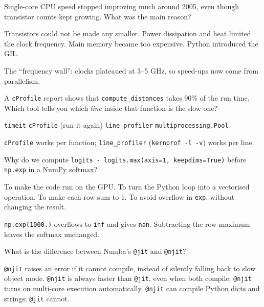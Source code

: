\documentclass[addpoints,11pt]{exam}
\newcommand{\q}{\Needspace{7\baselineskip}\question}
\begin{document}
\begin{questions}

\q[4]
Single-core CPU speed stopped improving much around 2005, even though transistor counts kept
growing. What was the main reason?
\begin{choices}
  \choice Transistors could not be made any smaller.
  \CorrectChoice Power dissipation and heat limited the clock frequency.
  \choice Main memory became too expensive.
  \choice Python introduced the GIL.
\end{choices}
\begin{solution}The ``frequency wall'': clocks plateaued at 3--5 GHz, so speed-ups now come from parallelism.\end{solution}

\q[4]
A \texttt{cProfile} report shows that \texttt{compute\_distances} takes 90\% of the run time. Which tool
tells you which \emph{line} inside that function is the slow one?
\begin{choices}
  \choice \texttt{timeit}
  \choice \texttt{cProfile} (run it again)
  \CorrectChoice \texttt{line\_profiler}
  \choice \texttt{multiprocessing.Pool}
\end{choices}
\begin{solution}\texttt{cProfile} works per function; \texttt{line\_profiler} (\texttt{kernprof -l -v}) works per line.\end{solution}

\q[4]
Why do we compute \texttt{logits - logits.max(axis=1, keepdims=True)} before \texttt{np.exp} in a
NumPy softmax?
\begin{choices}
  \choice To make the code run on the GPU.
  \choice To turn the Python loop into a vectorised operation.
  \choice To make each row sum to 1.
  \CorrectChoice To avoid overflow in \texttt{exp}, without changing the result.
  
\end{choices}
\begin{solution}\texttt{np.exp(1000.)} overflows to \texttt{inf} and gives \texttt{nan}. Subtracting the row maximum leaves the softmax unchanged.\end{solution}

\q[4]
What is the difference between Numba's \texttt{@jit} and \texttt{@njit}?
\begin{choices}
  \CorrectChoice \texttt{@njit} raises an error if it cannot compile, instead of silently falling back to slow object mode.
  \choice \texttt{@njit} is always faster than \texttt{@jit}, even when both compile.
  \choice \texttt{@njit} turns on multi-core execution automatically.
  \choice \texttt{@njit} can compile Python dicts and strings; \texttt{@jit} cannot.
  

\end{choices}
\end{questions}
\end{document}
